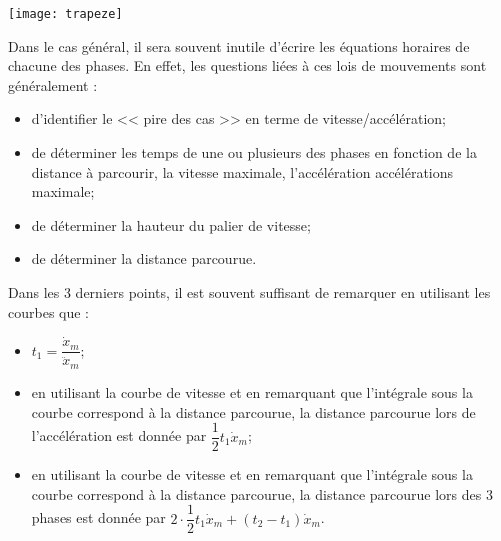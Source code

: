 \begin{marginfigure}
\texttt{[image: trapeze]}
\end{marginfigure}

Dans le cas général, il sera souvent inutile d'écrire les équations horaires de chacune des phases. En effet, les questions liées à ces lois de mouvements sont généralement :
\begin{itemize}
\item d'identifier le << pire des cas >> en terme de vitesse/accélération;
\item de déterminer les temps de une ou plusieurs des phases en fonction de la distance à parcourir, la vitesse maximale, l'accélération accélérations maximale;
\item de déterminer la hauteur du palier de vitesse;
\item de déterminer la distance parcourue. 
\end{itemize}



\begin{resultat}
Dans les 3 derniers points, il est souvent suffisant de remarquer en utilisant les courbes que : 
\begin{itemize}
\item $t_1=\dfrac{\dot{x}_m}{\ddot{x}_m}$;
\item en utilisant la courbe de vitesse et en remarquant que l'intégrale sous la courbe correspond à la distance parcourue, la distance parcourue lors de l'accélération est donnée par $\dfrac{1}{2}t_1\dot{x}_m$;
\item en utilisant la courbe de vitesse et en remarquant que l'intégrale sous la courbe correspond à la distance parcourue, la distance parcourue lors des 3 phases est donnée par $2\cdot \dfrac{1}{2}t_1\dot{x}_m+\left(t_2-t_1\right)\dot{x}_m$.
\end{itemize}
\end{resultat}



